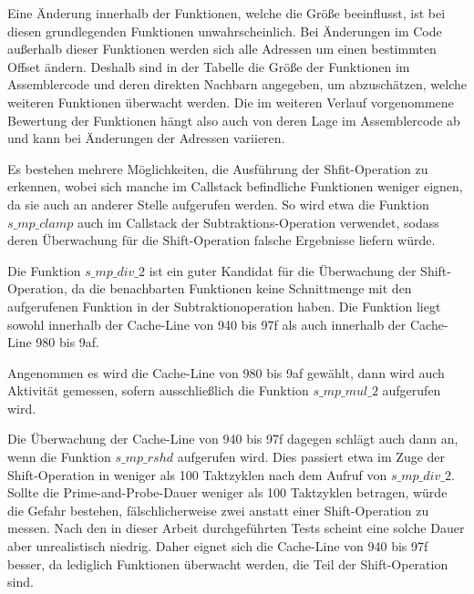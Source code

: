 Eine Änderung innerhalb der Funktionen, welche die Größe beeinflusst, ist bei diesen grundlegenden Funktionen unwahrscheinlich.
Bei Änderungen im Code außerhalb dieser Funktionen werden sich alle Adressen um einen bestimmten Offset ändern.
Deshalb sind in der Tabelle die Größe der Funktionen im Assemblercode und deren direkten Nachbarn angegeben, um abzuschätzen, welche weiteren Funktionen überwacht werden.
Die im weiteren Verlauf vorgenommene Bewertung der Funktionen hängt also auch von deren Lage im Assemblercode ab und kann bei Änderungen der Adressen variieren.

Es bestehen mehrere Möglichkeiten, die Ausführung der Shfit-Operation zu erkennen, wobei sich manche im Callstack befindliche Funktionen weniger eignen, da sie auch an anderer Stelle aufgerufen werden.
So wird etwa die Funktion $s\_mp\_clamp$ auch im Callstack der Subtraktions-Operation verwendet, sodass deren Überwachung für die Shift-Operation falsche Ergebnisse liefern würde.

Die Funktion $s\_mp\_div\_2$ ist ein guter Kandidat für die Überwachung der Shift-Operation, da die benachbarten Funktionen keine Schnittmenge mit den aufgerufenen Funktion in der Subtraktionoperation haben.
Die Funktion liegt sowohl innerhalb der Cache-Line von 940 bis 97f als auch innerhalb der Cache-Line 980 bis 9af.

Angenommen es wird die Cache-Line von 980 bis 9af gewählt, dann wird auch Aktivität gemessen, sofern ausschließlich die Funktion $s\_mp\_mul\_2$ aufgerufen wird.

Die Überwachung der Cache-Line von 940 bis 97f dagegen schlägt auch dann an, wenn die Funktion $s\_mp\_rshd$ aufgerufen wird.
Dies passiert etwa im Zuge der Shift-Operation in weniger als 100 Taktzyklen nach dem Aufruf von $s\_mp\_div\_2$.
Sollte die Prime-and-Probe-Dauer weniger als 100 Taktzyklen betragen, würde die Gefahr bestehen, fälschlicherweise zwei anstatt einer Shift-Operation zu messen.
Nach den in dieser Arbeit durchgeführten Tests scheint eine solche Dauer aber unrealistisch niedrig.
Daher eignet sich die Cache-Line von 940 bis 97f besser, da lediglich Funktionen überwacht werden, die Teil der Shift-Operation sind.


